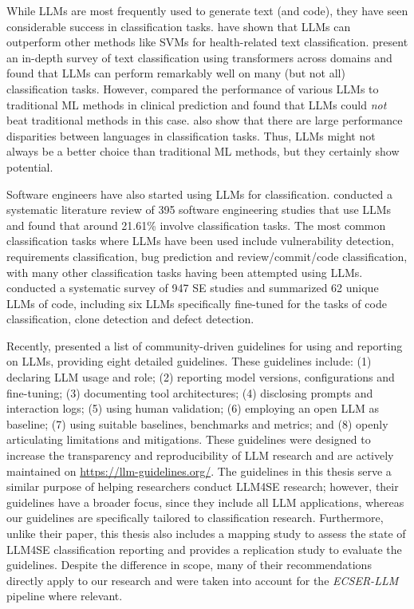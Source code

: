 \documentclass[a4paper]{article}
\newcommand{\newecser}{\textit{ECSER-LLM} }
\begin{document}
While LLMs are most frequently used to generate text (and code), they have seen considerable success in classification tasks. \textcite{Guo2024health} have shown that LLMs can outperform other methods like SVMs for health-related text classification. \textcite{fields2024} present an in-depth survey of text classification using transformers across domains and found that LLMs can perform remarkably well on many (but not all) classification tasks. However, \textcite{Chen2024} compared the performance of various LLMs to traditional ML methods in clinical prediction and found that LLMs could \textit{not} beat traditional methods in this case. \textcite{vajjala2025} also show that there are large performance disparities between languages in classification tasks. Thus, LLMs might not always be a better choice than traditional ML methods, but they certainly show potential. 

Software engineers have also started using LLMs for classification. \textcite{hou2024} conducted a systematic literature review of 395 software engineering studies that use LLMs and found that around 21.61\% involve classification tasks. The most common classification tasks where LLMs have been used include vulnerability detection, requirements classification, bug prediction and review/commit/code classification, with many other classification tasks having been attempted using LLMs. \textcite{zhang2024} conducted a systematic survey of 947 SE studies and summarized 62 unique LLMs of code, including six LLMs specifically fine-tuned for the tasks of code classification, clone detection and defect detection.

Recently, \textcite{baltes2025guidelinesempiricalstudiessoftware} presented a list of community-driven guidelines for using and reporting on LLMs, providing eight detailed guidelines. These guidelines include: (1) declaring LLM usage and role; (2) reporting model versions, configurations and fine-tuning; (3) documenting tool architectures; (4) disclosing prompts and interaction logs; (5) using human validation; (6) employing an open LLM as baseline; (7) using suitable baselines, benchmarks and metrics; and (8) openly articulating limitations and mitigations. These guidelines were designed to increase the transparency and reproducibility of LLM research and are actively maintained on \url{https://llm-guidelines.org/}. The guidelines in this thesis serve a similar purpose of helping researchers conduct LLM4SE research; however, their guidelines have a broader focus, since they include all LLM applications, whereas our guidelines are specifically tailored to classification research. Furthermore, unlike their paper, this thesis also includes a mapping study to assess the state of LLM4SE classification reporting and provides a replication study to evaluate the guidelines. Despite the difference in scope, many of their recommendations directly apply to our research and were taken into account for the \newecser pipeline where relevant.
\end{document}
